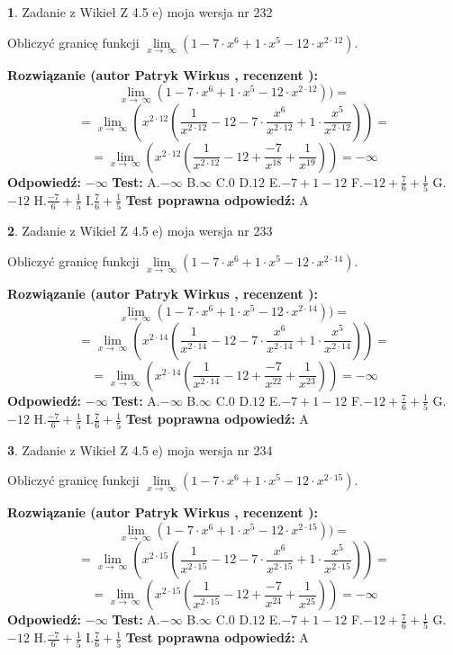 \documentclass[12pt, a4paper]{article}
\theoremstyle{definition} %
\newtheorem{zad}{}
\newcommand{\zadStart}[1]{\begin{zad}#1\newline}
\newcommand{\zadStop}{\end{zad}}
\newcommand{\rozwStart}[2]{\noindent \textbf{Rozwiązanie (autor #1 , recenzent #2): }\newline}
\newcommand{\rozwStop}{\newline}
\newcommand{\odpStart}{\noindent \textbf{Odpowiedź:}\newline}
\newcommand{\odpStop}{\newline}
\newcommand{\testStart}{\noindent \textbf{Test:}\newline}
\newcommand{\testStop}{\newline}
\newcommand{\kluczStart}{\noindent \textbf{Test poprawna odpowiedź:}\newline}
\newcommand{\kluczStop}{\newline}
\begin{document}
\zadStart{Zadanie z Wikieł Z 4.5 e) moja wersja nr 232}



Obliczyć granicę funkcji  $\lim\limits_{x\to\ \infty}(1 - 7 \cdot x^{6}+1 \cdot x^{5}- 12 \cdot x^{2\cdot12})$.
\zadStop
\rozwStart{Patryk Wirkus}{}
$$\lim\limits_{x\to\ \infty}(1 - 7 \cdot x^{6}+1 \cdot x^{5}- 12 \cdot x^{2\cdot12}))=$$
$$=\lim\limits_{x\to\ \infty}(x^{2\cdot12}(\frac{1}{x^{2\cdot12}}-12 -7 \cdot \frac{x^{6}}{x^{2\cdot12}}+1 \cdot \frac{x^{5}}{x^{2\cdot12}}))=$$
$$=\lim\limits_{x\to\ \infty}(x^{2\cdot12}(\frac{1}{x^{2\cdot12}}-12 + \frac{-7}{x^{18}}+ \frac{1}{x^{19}}))=-\infty$$
\rozwStop
\odpStart
$-\infty$
\odpStop
\testStart
A.$-\infty$ B.$\infty$ C.$0$ D.$12$ E.$-7 + 1 - 12$
F.$-12+\frac{7}{6}+\frac{1}{5}$ G.$-12$
H.$\frac{-7}{6}+\frac{1}{5}$
I.$\frac{7}{6}+\frac{1}{5}$
\testStop
\kluczStart
A
\kluczStop



\zadStart{Zadanie z Wikieł Z 4.5 e) moja wersja nr 233}



Obliczyć granicę funkcji  $\lim\limits_{x\to\ \infty}(1 - 7 \cdot x^{6}+1 \cdot x^{5}- 12 \cdot x^{2\cdot14})$.
\zadStop
\rozwStart{Patryk Wirkus}{}
$$\lim\limits_{x\to\ \infty}(1 - 7 \cdot x^{6}+1 \cdot x^{5}- 12 \cdot x^{2\cdot14}))=$$
$$=\lim\limits_{x\to\ \infty}(x^{2\cdot14}(\frac{1}{x^{2\cdot14}}-12 -7 \cdot \frac{x^{6}}{x^{2\cdot14}}+1 \cdot \frac{x^{5}}{x^{2\cdot14}}))=$$
$$=\lim\limits_{x\to\ \infty}(x^{2\cdot14}(\frac{1}{x^{2\cdot14}}-12 + \frac{-7}{x^{22}}+ \frac{1}{x^{23}}))=-\infty$$
\rozwStop
\odpStart
$-\infty$
\odpStop
\testStart
A.$-\infty$ B.$\infty$ C.$0$ D.$12$ E.$-7 + 1 - 12$
F.$-12+\frac{7}{6}+\frac{1}{5}$ G.$-12$
H.$\frac{-7}{6}+\frac{1}{5}$
I.$\frac{7}{6}+\frac{1}{5}$
\testStop
\kluczStart
A
\kluczStop



\zadStart{Zadanie z Wikieł Z 4.5 e) moja wersja nr 234}



Obliczyć granicę funkcji  $\lim\limits_{x\to\ \infty}(1 - 7 \cdot x^{6}+1 \cdot x^{5}- 12 \cdot x^{2\cdot15})$.
\zadStop
\rozwStart{Patryk Wirkus}{}
$$\lim\limits_{x\to\ \infty}(1 - 7 \cdot x^{6}+1 \cdot x^{5}- 12 \cdot x^{2\cdot15}))=$$
$$=\lim\limits_{x\to\ \infty}(x^{2\cdot15}(\frac{1}{x^{2\cdot15}}-12 -7 \cdot \frac{x^{6}}{x^{2\cdot15}}+1 \cdot \frac{x^{5}}{x^{2\cdot15}}))=$$
$$=\lim\limits_{x\to\ \infty}(x^{2\cdot15}(\frac{1}{x^{2\cdot15}}-12 + \frac{-7}{x^{24}}+ \frac{1}{x^{25}}))=-\infty$$
\rozwStop
\odpStart
$-\infty$
\odpStop
\testStart
A.$-\infty$ B.$\infty$ C.$0$ D.$12$ E.$-7 + 1 - 12$
F.$-12+\frac{7}{6}+\frac{1}{5}$ G.$-12$
H.$\frac{-7}{6}+\frac{1}{5}$
I.$\frac{7}{6}+\frac{1}{5}$
\testStop
\kluczStart
A
\kluczStop
\end{document}
